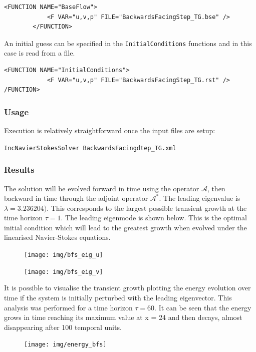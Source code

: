       \begin{lstlisting}[style=XMLStyle]
<FUNCTION NAME="BaseFlow">
            <F VAR="u,v,p" FILE="BackwardsFacingStep_TG.bse" />
        </FUNCTION>
       \end{lstlisting}


An initial guess can be specified in the \texttt{InitialConditions}
functions and in this case is read from a file.

 \begin{lstlisting}[style=XMLStyle]
<FUNCTION NAME="InitialConditions">
            <F VAR="u,v,p" FILE="BackwardsFacingStep_TG.rst" />
/FUNCTION>
                                        \end{lstlisting}


\subsubsection*{Usage}

Execution is relatively straightforward once the input files are setup:

\texttt{IncNavierStokesSolver BackwardsFacingdtep\_TG.xml}

\subsubsection*{Results}

The solution will be evolved forward in time using the operator
$\mathcal{A}$, then backward in time through the adjoint operator
$\mathcal{A}^*$. The leading eigenvalue is $\lambda= 3.236204)$. This
corresponds to the largest possible transient growth at the time
horizon $\tau= 1$. The leading eigenmode is shown below. This is the
optimal initial condition which will lead to the greatest growth when
evolved under the linearised Navier-Stokes equations.

\begin{figure}[!htbp]
\centering
 {\texttt{[image: img/bfs\_eig\_u]}}
   \caption {}
\end{figure}

\begin{figure}[!htbp]
\centering
 {\texttt{[image: img/bfs\_eig\_v]}}
    \caption {}
\end{figure}

It is possible to visualise the transient growth plotting the energy
evolution over time if the system is initially perturbed with the
leading eigenvector. This analysis was performed for a time horizon
$\tau= 60$. It can be seen that the energy grows in time reaching its
maximum value at x = 24 and then decays, almost disappearing after 100
temporal units.


\begin{figure}[!htbp]
\centering
 {\texttt{[image: img/energy\_bfs]}}
   \caption {}
\end{figure}


